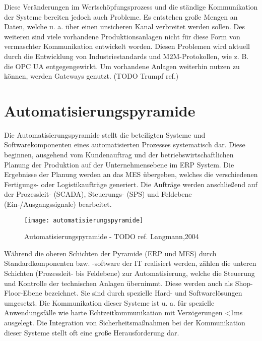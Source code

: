 Diese Veränderungen im Wertschöpfungsprozess und die ständige Kommunikation der Systeme bereiten jedoch auch Probleme. Es entstehen große Mengen an Daten, welche u. a. über einen unsicheren Kanal verbreitet werden sollen. Des weiteren sind viele vorhandene Produktionsanlagen nicht für diese Form von vermaschter Kommunikation entwickelt worden. Diesen Problemen wird aktuell durch die Entwicklung von Industriestandards und \ac{M2M}-Protokollen, wie z. B. die \ac{OPC UA} entgegengewirkt. Um vorhandene Anlagen weiterhin nutzen zu können, werden Gateways genutzt. (TODO Trumpf ref.)

\section{Automatisierungspyramide}
Die Automatisierungspyramide stellt die beteiligten Systeme und Softwarekomponenten eines automatisierten Prozesses systematisch dar. Diese beginnen, ausgehend vom Kundenauftrag und der betriebswirtschaftlichen Planung der Produktion auf der Unternehmensebene im \ac{ERP} System. Die Ergebnisse der Planung werden an das \ac{MES} übergeben, welches die verschiedenen Fertigungs- oder Logistikaufträge generiert. Die Aufträge werden anschließend auf der Prozessleit- (\ac{SCADA}), Steuerungs- (\ac{SPS}) und Feldebene (Ein-/Ausgangssignale) bearbeitet.

\begin{figure}[h]
  \centering
  \texttt{[image: automatisierungspyramide]}
  \caption{Automatisierungspyramide - TODO ref. Langmann,2004}
  \label{Kap2:Automatisierungspyramide}
\end{figure}

\clearpage

Während die oberen Schichten der Pyramide (\ac{ERP} und \ac{MES}) durch Standardkomponenten bzw. -software der IT realisiert werden, zählen die unteren Schichten (Prozessleit- bis Feldebene) zur Automatisierung, welche die Steuerung und Kontrolle der technischen Anlagen übernimmt. Diese werden auch als Shop-Floor-Ebene bezeichnet. Sie sind durch spezielle Hard- und Softwarelösungen umgesetzt. Die Kommunikation dieser Systeme ist u. a. für spezielle Anwendungsfälle wie harte Echtzeitkommunikation mit Verzögerungen <1ms ausgelegt. Die Integration von Sicherheitsmaßnahmen bei der Kommunikation dieser Systeme stellt oft eine große Herausforderung dar.

